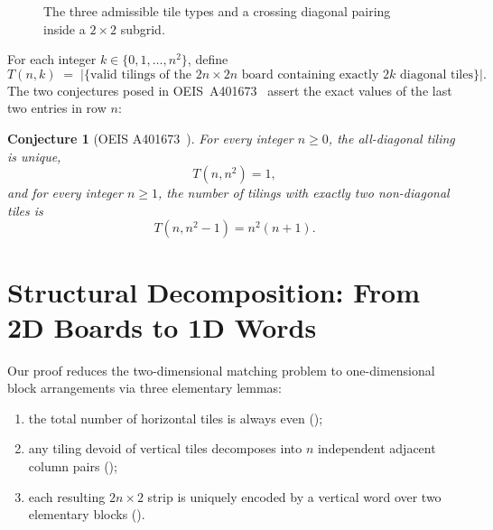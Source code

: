 \documentclass[11pt,a4paper]{article}
\theoremstyle{paperthm}
\newtheorem{conjecture}{Conjecture}
\theoremstyle{paperdef}
\begin{document}
\begin{figure}[htbp]
  \caption{The three admissible tile types and a crossing diagonal pairing inside a $2 \times 2$ subgrid.}
  \label{fig:tiles}
\end{figure}

For each integer $k \in \{0, 1, \dots, n^2\}$, define
\[
  T(n,k) \;=\; \bigl|\{\text{valid tilings of the } 2n \times 2n \text{ board containing exactly } 2k \text{ diagonal tiles}\}\bigr|.
\]
The two conjectures posed in OEIS~A401673~\cite{oeisA401673} assert the exact values of the last two entries in row $n$:

\begin{conjecture}[OEIS A401673~\cite{oeisA401673}]
  \label{conj:main}
  For every integer $n \ge 0$, the all-diagonal tiling is unique,
  \[
    T(n, n^2) = 1,
  \]
  and for every integer $n \ge 1$, the number of tilings with exactly two non-diagonal tiles is
  \[
    T(n, n^2 - 1) = n^2(n+1).
  \]
\end{conjecture}

\section{Structural Decomposition: From 2D Boards to 1D Words}
\label{sec:structure}

Our proof reduces the two-dimensional matching problem to one-dimensional block arrangements via three elementary lemmas:
\begin{enumerate}[label=(\roman*)]
  \item the total number of horizontal tiles is always even ();
  \item any tiling devoid of vertical tiles decomposes into $n$ independent adjacent column pairs ();
  \item each resulting $2n \times 2$ strip is uniquely encoded by a vertical word over two elementary blocks ().
\end{enumerate}
\end{document}
